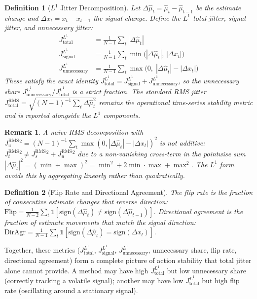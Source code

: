 \documentclass[11pt,a4paper]{article}
\newtheorem{definition}{Definition}
\newtheorem{remark}{Remark}
\begin{document}
\begin{definition}[$L^1$ Jitter Decomposition]
Let $\Delta\hat{\mu}_t = \hat{\mu}_t - \hat{\mu}_{t-1}$ be the estimate change
and $\Delta x_t = x_t - x_{t-1}$ the signal change. Define the
\emph{$L^1$ total jitter}, \emph{signal jitter}, and \emph{unnecessary jitter}:
\begin{align}
J_{\text{total}}^{L^1}     &= \tfrac{1}{N-1}\textstyle\sum_t |\Delta\hat{\mu}_t| \\
J_{\text{signal}}^{L^1}    &= \tfrac{1}{N-1}\textstyle\sum_t \min\!\big(|\Delta\hat{\mu}_t|,\,|\Delta x_t|\big) \\
J_{\text{unnecessary}}^{L^1} &= \tfrac{1}{N-1}\textstyle\sum_t \max\!\big(0,\;|\Delta\hat{\mu}_t|-|\Delta x_t|\big)
\end{align}
These satisfy the exact identity
$J_{\text{total}}^{L^1} = J_{\text{signal}}^{L^1} + J_{\text{unnecessary}}^{L^1}$,
so the \emph{unnecessary share}
$J_{\text{unnecessary}}^{L^1} / J_{\text{total}}^{L^1}$ is a strict fraction.
The standard RMS jitter
$J_{\text{total}}^{\text{RMS}} = \sqrt{(N-1)^{-1}\sum_t \Delta\hat{\mu}_t^2}$
remains the operational time-series stability metric and is reported alongside
the $L^1$ components.
\end{definition}

\begin{remark}
A naive RMS decomposition with
$J_u^{\text{RMS}}{}^2 = (N-1)^{-1}\sum_t \max(0,|\Delta\hat{\mu}_t|-|\Delta x_t|)^2$
is not additive: $J_t^{\text{RMS}}{}^2 \neq J_s^{\text{RMS}}{}^2 + J_u^{\text{RMS}}{}^2$
due to a non-vanishing cross-term in the pointwise sum
$|\Delta\hat{\mu}_t|^2 = (\min + \max)^2 = \min^2 + 2\min\cdot\max + \max^2$.
The $L^1$ form avoids this by aggregating linearly rather than quadratically.
\end{remark}

\begin{definition}[Flip Rate and Directional Agreement]
The \emph{flip rate} is the fraction of consecutive estimate changes that reverse
direction: $\text{Flip} = \frac{1}{N-2}\sum_t \mathbb{1}[\text{sign}(\Delta\hat{\mu}_t)
\neq \text{sign}(\Delta\hat{\mu}_{t-1})]$. \emph{Directional agreement} is the
fraction of estimate movements that match the signal direction:
$\text{DirAgr} = \frac{1}{N-1}\sum_t \mathbb{1}[\text{sign}(\Delta\hat{\mu}_t)
= \text{sign}(\Delta x_t)]$.
\end{definition}

Together, these metrics ($J_{\text{total}}^{L^1}$, $J_{\text{signal}}^{L^1}$,
$J_{\text{unnecessary}}^{L^1}$, unnecessary share, flip rate, directional
agreement) form a complete picture of action stability that total jitter alone
cannot provide. A method may have high $J_{\text{total}}^{L^1}$ but low
unnecessary share (correctly tracking a volatile signal); another may have low
$J_{\text{total}}^{L^1}$ but high flip rate (oscillating around a stationary
signal).
\end{document}
